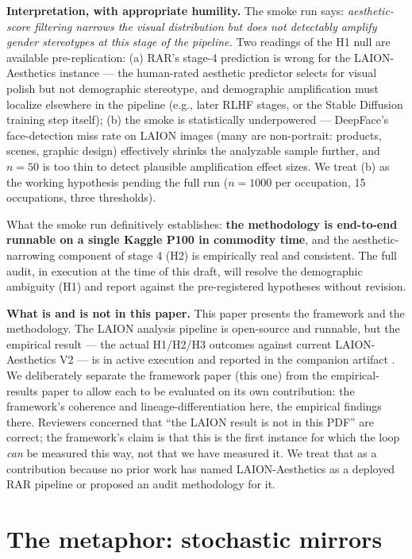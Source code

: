 \documentclass[sigconf,nonacm]{acmart}
\begin{document}
\textbf{Interpretation, with appropriate humility.} The smoke run says: \emph{aesthetic-score filtering narrows the visual distribution but does not detectably amplify gender stereotypes at this stage of the pipeline.} Two readings of the H1 null are available pre-replication: (a) RAR's stage-4 prediction is wrong for the LAION-Aesthetics instance --- the human-rated aesthetic predictor selects for visual polish but not demographic stereotype, and demographic amplification must localize elsewhere in the pipeline (e.g., later RLHF stages, or the Stable Diffusion training step itself); (b) the smoke is statistically underpowered --- DeepFace's face-detection miss rate on LAION images (many are non-portrait: products, scenes, graphic design) effectively shrinks the analyzable sample further, and \(n=50\) is too thin to detect plausible amplification effect sizes. We treat (b) as the working hypothesis pending the full run (\(n=1000\) per occupation, 15 occupations, three thresholds).

What the smoke run definitively establishes: \textbf{the methodology is end-to-end runnable on a single Kaggle P100 in commodity time}, and the aesthetic-narrowing component of stage 4 (H2) is empirically real and consistent. The full audit, in execution at the time of this draft, will resolve the demographic ambiguity (H1) and report against the pre-registered hypotheses without revision.

\textbf{What is and is not in this paper.} This paper presents the framework and the methodology. The LAION analysis pipeline is open-source and runnable, but the empirical result --- the actual H1/H2/H3 outcomes against current LAION-Aesthetics V2 ---  is in active execution and reported in the companion artifact \cite{rar2026companion}. We deliberately separate the framework paper (this one) from the empirical-results paper to allow each to be evaluated on its own contribution: the framework's coherence and lineage-differentiation here, the empirical findings there. Reviewers concerned that ``the LAION result is not in this PDF'' are correct; the framework's claim is that this is the first instance for which the loop \emph{can} be measured this way, not that we have measured it. We treat that as a contribution because no prior work has named LAION-Aesthetics as a deployed RAR pipeline or proposed an audit methodology for it.

\section{The metaphor: stochastic mirrors}
\end{document}
